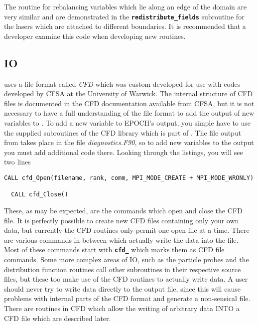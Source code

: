 \documentclass[12pt,a4paper]{article}
\newcommand{\simpleboxverbatim}{\begin{Verbatim}[obeytabs=true,frame=single,
  framerule=0.5mm,rulecolor=\color{warwickmid},formatcom=\color{black}]}
\newcommand{\inlinecode}[1]{{\color{warwickred} \bf\texttt{#1}}}
\newcommand{\EPOCH}{{\color{warwickdark}\fontfamily{phv}\selectfont{EPOCH}}}
\begin{document}
The routine for rebalancing variables which lie along an edge of the domain are
very similar and are demonstrated in the \inlinecode{redistribute\_fields}
subroutine for the lasers which are attached to different boundaries. It is
recommended that a developer examine this code when developing new routines.

\subsection{{\EPOCH} IO}

{\EPOCH} uses a file format called {\it CFD} which was custom developed for use
with codes developed by CFSA at the University of Warwick. The internal
structure of CFD files is documented in the CFD documentation available from
CFSA, but it is not necessary to have a full understanding of the file format
to add the output of new variables to \EPOCH. To add a new variable to EPOCH's
output, you simple have to use the supplied subroutines of the CFD library
which is part of \EPOCH. The file output from {\EPOCH} takes place in the file
{\it diagnostics.F90}, so to add new variables to the output you must add
additional code there. Looking through the listings, you will see two lines

\simpleboxverbatim
  CALL cfd_Open(filename, rank, comm, MPI_MODE_CREATE + MPI_MODE_WRONLY)

  CALL cfd_Close()
\end{Verbatim}

These, as may be expected, are the commands which open and close the CFD
file. It is perfectly possible to create new CFD files containing only your own
data, but currently the CFD routines only permit one open file at a time. There
are various commands in-between which actually write the data into the
file. Most of these commands start with \inlinecode{cfd\_} which marks them as
CFD file commands. Some more complex areas of IO, such as the particle probes
and the distribution function routines call other subroutines in their
respective source files, but these too make use of the CFD routines to actually
write data. A user should never try to write data directly to the output file,
since this will cause problems with internal parts of the CFD format and
generate a non-sensical file. There are routines in CFD which allow the writing
of arbitrary data INTO a CFD file which are described later.
\end{document}
